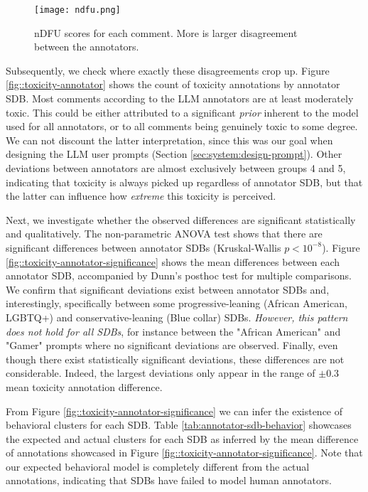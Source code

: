 \begin{figure}
	\centering
	\texttt{[image: ndfu.png]}
	\caption{\ac{nDFU} \cite{pavlopoulos-likas-2024-polarized} scores for each comment. More is larger disagreement between the annotators.}
	\label{fig::toxicity-ndfu}
\end{figure}

Subsequently, we check where exactly these disagreements crop up. Figure \ref{fig::toxicity-annotator} shows the count of toxicity annotations by annotator \ac{SDB}. Most comments according to the LLM annotators are at least moderately toxic. This could be either attributed to a significant \textit{prior} inherent to the model used for all annotators, or to all comments being genuinely toxic to some degree. We can not discount the latter interpretation, since this was our goal when designing the LLM user prompts (Section \ref{sec:system:design-prompt}). Other deviations between annotators are almost exclusively between groups 4 and 5, indicating that toxicity is always picked up regardless of annotator \ac{SDB}, but that the latter can influence how \textit{extreme} this toxicity is perceived.

Next, we investigate whether the observed differences are significant statistically and qualitatively. The non-parametric ANOVA test shows that there are significant differences between annotator \acp{SDB} (Kruskal-Wallis $p<10^{-8}$). Figure \ref{fig::toxicity-annotator-significance} shows the mean differences between each annotator \ac{SDB}, accompanied by Dunn's posthoc test for multiple comparisons. We confirm that significant deviations exist between annotator \acp{SDB} and, interestingly, specifically between some progressive-leaning (African American, LGBTQ+) and conservative-leaning (Blue collar) \acp{SDB}. \textit{However, this pattern does not hold for all \acp{SDB}}, for instance between the "African American" and "Gamer" prompts where no significant deviations are observed. Finally, even though there exist statistically significant deviations, these differences are not considerable. Indeed, the largest deviations only appear in the range of $\pm 0.3$ mean toxicity annotation difference.

From Figure \ref{fig::toxicity-annotator-significance} we can infer the existence of behavioral clusters for each \ac{SDB}. Table \ref{tab:annotator-sdb-behavior} showcases the expected and actual clusters for each \ac{SDB} as inferred by the mean difference of annotations showcased in Figure \ref{fig::toxicity-annotator-significance}. Note that our expected behavioral model is completely different from the actual annotations, indicating that \acp{SDB} have failed to model human annotators.



